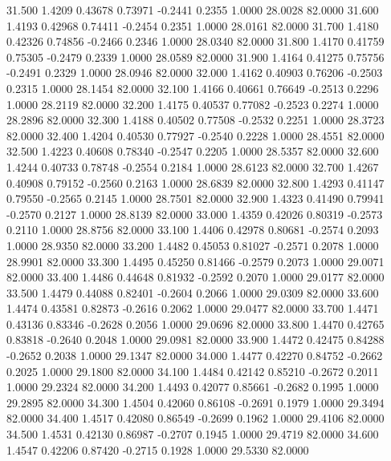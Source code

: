   31.500   1.4209   0.43678   0.73971  -0.2441   0.2355   1.0000  28.0028  82.0000
  31.600   1.4193   0.42968   0.74411  -0.2454   0.2351   1.0000  28.0161  82.0000
  31.700   1.4180   0.42326   0.74856  -0.2466   0.2346   1.0000  28.0340  82.0000
  31.800   1.4170   0.41759   0.75305  -0.2479   0.2339   1.0000  28.0589  82.0000
  31.900   1.4164   0.41275   0.75756  -0.2491   0.2329   1.0000  28.0946  82.0000
  32.000   1.4162   0.40903   0.76206  -0.2503   0.2315   1.0000  28.1454  82.0000
  32.100   1.4166   0.40661   0.76649  -0.2513   0.2296   1.0000  28.2119  82.0000
  32.200   1.4175   0.40537   0.77082  -0.2523   0.2274   1.0000  28.2896  82.0000
  32.300   1.4188   0.40502   0.77508  -0.2532   0.2251   1.0000  28.3723  82.0000
  32.400   1.4204   0.40530   0.77927  -0.2540   0.2228   1.0000  28.4551  82.0000
  32.500   1.4223   0.40608   0.78340  -0.2547   0.2205   1.0000  28.5357  82.0000
  32.600   1.4244   0.40733   0.78748  -0.2554   0.2184   1.0000  28.6123  82.0000
  32.700   1.4267   0.40908   0.79152  -0.2560   0.2163   1.0000  28.6839  82.0000
  32.800   1.4293   0.41147   0.79550  -0.2565   0.2145   1.0000  28.7501  82.0000
  32.900   1.4323   0.41490   0.79941  -0.2570   0.2127   1.0000  28.8139  82.0000
  33.000   1.4359   0.42026   0.80319  -0.2573   0.2110   1.0000  28.8756  82.0000
  33.100   1.4406   0.42978   0.80681  -0.2574   0.2093   1.0000  28.9350  82.0000
  33.200   1.4482   0.45053   0.81027  -0.2571   0.2078   1.0000  28.9901  82.0000
  33.300   1.4495   0.45250   0.81466  -0.2579   0.2073   1.0000  29.0071  82.0000
  33.400   1.4486   0.44648   0.81932  -0.2592   0.2070   1.0000  29.0177  82.0000
  33.500   1.4479   0.44088   0.82401  -0.2604   0.2066   1.0000  29.0309  82.0000
  33.600   1.4474   0.43581   0.82873  -0.2616   0.2062   1.0000  29.0477  82.0000
  33.700   1.4471   0.43136   0.83346  -0.2628   0.2056   1.0000  29.0696  82.0000
  33.800   1.4470   0.42765   0.83818  -0.2640   0.2048   1.0000  29.0981  82.0000
  33.900   1.4472   0.42475   0.84288  -0.2652   0.2038   1.0000  29.1347  82.0000
  34.000   1.4477   0.42270   0.84752  -0.2662   0.2025   1.0000  29.1800  82.0000
  34.100   1.4484   0.42142   0.85210  -0.2672   0.2011   1.0000  29.2324  82.0000
  34.200   1.4493   0.42077   0.85661  -0.2682   0.1995   1.0000  29.2895  82.0000
  34.300   1.4504   0.42060   0.86108  -0.2691   0.1979   1.0000  29.3494  82.0000
  34.400   1.4517   0.42080   0.86549  -0.2699   0.1962   1.0000  29.4106  82.0000
  34.500   1.4531   0.42130   0.86987  -0.2707   0.1945   1.0000  29.4719  82.0000
  34.600   1.4547   0.42206   0.87420  -0.2715   0.1928   1.0000  29.5330  82.0000
